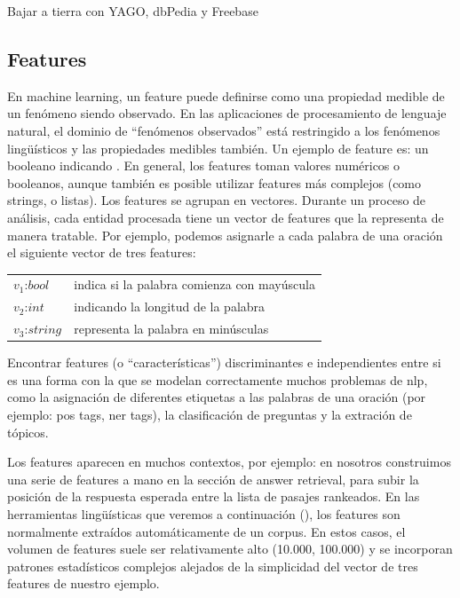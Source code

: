 {\color{red} Bajar a tierra con YAGO, dbPedia y Freebase}

\subsection*{Features}
En machine learning, un feature puede definirse como una propiedad medible de un fenómeno siendo observado. En las aplicaciones de procesamiento de lenguaje natural, el dominio de “fenómenos observados” está restringido a los fenómenos lingüísticos y las propiedades medibles también. Un ejemplo de feature es: un booleano indicando . En general, los features toman valores numéricos o booleanos, aunque también es posible utilizar features más complejos (como strings, o listas). Los features se agrupan en vectores. Durante un proceso de análisis, cada entidad procesada tiene un vector de features que la representa de manera tratable. Por ejemplo, podemos asignarle a cada palabra de una oración el siguiente vector de tres features:

\begin{center}
\begin{tabular}{ll}
$v_1$:$bool$ & indica si la palabra comienza con mayúscula \\
$v_2$:$int$ & indicando la longitud de la palabra \\
$v_3$:$string$ & representa la palabra en minúsculas \\
\end{tabular}
\end{center}


Encontrar features (o “características”) discriminantes e independientes entre si es una forma con la que se modelan correctamente muchos problemas de nlp, como la asignación de diferentes etiquetas a las palabras de una oración (por ejemplo: pos tags, ner tags), la clasificación de preguntas y la extración de tópicos. 

Los features aparecen en muchos contextos, por ejemplo: en  nosotros construimos una serie de features a mano en la sección de answer retrieval, para subir la posición de la respuesta esperada entre la lista de pasajes rankeados. En las herramientas lingüísticas que veremos a continuación (), los features son normalmente extraídos automáticamente de un corpus. En estos casos, el volumen de features suele ser relativamente alto (10.000, 100.000) y se incorporan patrones estadísticos complejos alejados de la simplicidad del vector de tres features de nuestro ejemplo. 

